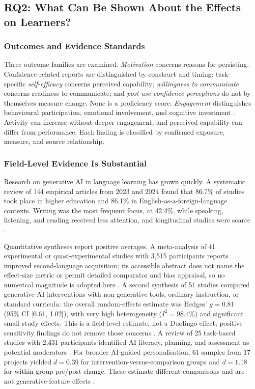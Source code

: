\documentclass[11pt,titlepage]{article}
\begin{document}
\subsection{RQ2: What Can Be Shown About the Effects on Learners?}
\label{sec:rq2}
\subsubsection{Outcomes and Evidence Standards}
Three outcome families are examined. \emph{Motivation} concerns reasons for persisting. Confidence-related reports are distinguished by construct and timing: task-specific \emph{self-efficacy} concerns perceived capability; \emph{willingness to communicate} concerns readiness to communicate; and \emph{post-use confidence perceptions} do not by themselves measure change. None is a proficiency score. \emph{Engagement} distinguishes behavioural participation, emotional involvement, and cognitive investment \parencite{loEngagement2024}. Activity can increase without deeper engagement, and perceived capability can differ from performance. Each finding is classified by confirmed exposure, measure, and source relationship.

\subsubsection{Field-Level Evidence Is Substantial}
Research on generative AI in language learning has grown quickly. A systematic review of 144 empirical articles from 2023 and 2024 found that 86.7\% of studies took place in higher education and 86.1\% in English-as-a-foreign-language contexts. Writing was the most frequent focus, at 42.4\%, while speaking, listening, and reading received less attention, and longitudinal studies were scarce \parencite{liReview2025}.

Quantitative syntheses report positive averages. A meta-analysis of 41 experimental or quasi-experimental studies with 3,515 participants reports improved second-language acquisition; its accessible abstract does not name the effect-size metric or permit detailed comparator and bias appraisal, so no numerical magnitude is adopted here \parencite{liMeta2025}. A second synthesis of 51 studies compared generative-AI interventions with non-generative tools, ordinary instruction, or standard curricula: the overall random-effects estimate was Hedges' \(g = 0.81\) (95\% CI [0.61, 1.02]), with very high heterogeneity (\(I^2 = 98.4\%\)) and significant small-study effects. This is a field-level estimate, not a Duolingo effect; positive sensitivity findings do not remove those concerns \parencite[Sections 3.1, 4.3]{saarela2026}. A review of 25 task-based studies with 2,431 participants identified AI literacy, planning, and assessment as potential moderators \parencite{liTask2026}. For broader AI-guided personalisation, 61 samples from 17 projects yielded \(d = 0.39\) for intervention-versus-comparison groups and \(d = 1.18\) for within-group pre/post change. These estimate different comparisons and are not generative-feature effects \parencite{lee2024}.
\end{document}

